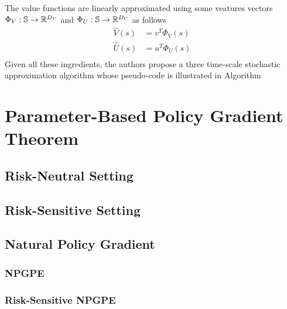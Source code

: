 The value functions are linearly approximated using some veatures vectors
$\Phi_V: \mathbb{S} \to \mathbb{R}^{D_V}$ and $\Phi_U: \mathbb{S} \to \mathbb{R}^{D_U}$ as follows
\begin{equation}
	\begin{split}
		\widehat{V}(s) &= v^T \Phi_V(s)\\
		\widehat{U}(s) &= u^T \Phi_U(s)\\
	\end{split}
\end{equation}
Given all these ingredients, the authors propose a three time-scale stochastic
approximation algorithm whose pseudo-code is illustrated in Algorithm


\section{Parameter-Based Policy Gradient Theorem}

\subsection{Risk-Neutral Setting}

\subsection{Risk-Sensitive Setting}

\subsection{Natural Policy Gradient}

\subsubsection{NPGPE}

\subsubsection{Risk-Sensitive NPGPE}

